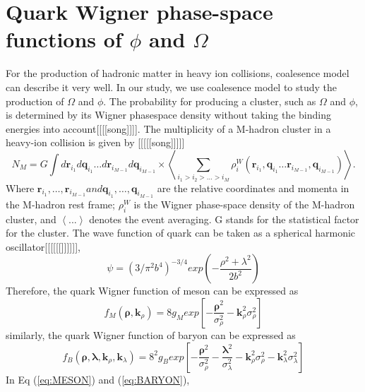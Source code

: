 \documentclass[11pt,a4paper,openany]{article}
\newcommand{\sigmaRho}{\sigma_{\rho}^{2}}
\newcommand{\sigmaLambda}{\sigma_{\lambda}^{2}}
\begin{document}
\section{Quark Wigner phase-space functions of $\phi$ and $\Omega$}
For the production of hadronic matter in heavy ion collisions, coalesence model can describe it very well. In our study,
we use coalesence model to study the production of $\Omega$ and $\phi$. The probability for producing a cluster, such as
$\Omega$ and $\phi$, is determined by its Wigner phasespace density without taking the binding
energies into account[[[[song]]]]. The multiplicity of a M-hadron cluster in a heavy-ion collision is given by [[[[[song]]]]]
\begin{equation}
  \label{eq:pro}
  N_{M} = G\int{d\boldsymbol{r}_{i_{1}}}d\boldsymbol{q}_{i_{1}}{\dots}d\boldsymbol{r}_{i_{M-1}}d\boldsymbol{q}_{i_{M-1}}
\times
\left<
  \sum_{i_1>i_2>\dots>i_M}\rho_{i}^{W}(\boldsymbol{r}_{i_{1}},\boldsymbol{q}_{i_{1}}\dots\boldsymbol{r}_{i_{M-1}},\boldsymbol{q}_{i_{M-1}})
\right>.
\end{equation}
Where $\boldsymbol{r}_{i_{1}},\dots,\boldsymbol{r}_{i_{M-1}} and \boldsymbol{q}_{i_{1}},\dots,\boldsymbol{q}_{i_{M-1}}$
are the relative coordinates and momenta in the M-hadron rest frame; $\rho_i^W$ is the Wigner phase-space density of the
M-hadron cluster, and
$\left<...\right>$ denotes the event averaging. G stands for the statistical factor for the cluster.
The wave function of quark can be taken as a spherical harmonic oscillator[[[[[[]]]]]],
\begin{equation}
  \label{eq:wave}
  \psi = (3/\pi^{2}b^{4})^{-3/4}exp
  \left(
    -\frac{\rho^{2}+\lambda^{2}}{2b^2}
  \right)
\end{equation}
Therefore, the quark Wigner function of meson can be expressed as
\begin{equation}
  \label{eq:MESON}
  f_{M}(\boldsymbol{\rho},\boldsymbol{k}_{\rho}) = 8g_{M}exp
  \left[
    -\frac{\boldsymbol{\rho}^2}{\sigmaRho}-\boldsymbol{k}_\rho^{2}\sigmaRho
  \right]
\end{equation}
similarly, the quark Wigner function of baryon can be expressed as
\begin{equation}
  \label{eq:BARYON}
  f_{B}(\boldsymbol{\rho},\boldsymbol{\lambda},\boldsymbol{k}_{\rho},\boldsymbol{k}_{\lambda})
= 8^2g_{B}exp
\left[
  -\frac{\boldsymbol{\rho}^2}{\sigmaRho}-\frac{\boldsymbol{\lambda}^2}{\sigmaLambda}-\boldsymbol{k}_{\rho}^{2}\sigmaRho-\boldsymbol{k}_{\lambda}^{2}\sigmaLambda
\right]
\end{equation}
In Eq (\ref{eq:MESON}) and (\ref{eq:BARYON}),
\end{document}
